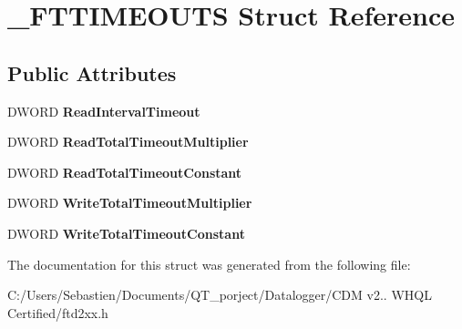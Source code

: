\hypertarget{struct___f_t_t_i_m_e_o_u_t_s}{}\section{\+\_\+\+F\+T\+T\+I\+M\+E\+O\+U\+TS Struct Reference}
\label{struct___f_t_t_i_m_e_o_u_t_s}
\subsection*{Public Attributes}
\begin{DoxyCompactItemize}
\item 
\mbox{\label{struct___f_t_t_i_m_e_o_u_t_s_a0f9592f9863a3230933833750b67d467}} 
D\+W\+O\+RD {\bfseries Read\+Interval\+Timeout}
\item 
\mbox{\label{struct___f_t_t_i_m_e_o_u_t_s_abec01499b73ce0bd194ca0628dbf58e8}} 
D\+W\+O\+RD {\bfseries Read\+Total\+Timeout\+Multiplier}
\item 
\mbox{\label{struct___f_t_t_i_m_e_o_u_t_s_aa6478849c632565b01f91faca975cabe}} 
D\+W\+O\+RD {\bfseries Read\+Total\+Timeout\+Constant}
\item 
\mbox{\label{struct___f_t_t_i_m_e_o_u_t_s_a1944986d4b6760a45db8ce1b58fa3688}} 
D\+W\+O\+RD {\bfseries Write\+Total\+Timeout\+Multiplier}
\item 
\mbox{\label{struct___f_t_t_i_m_e_o_u_t_s_ac36dfafaf9522e0b041080242538d196}} 
D\+W\+O\+RD {\bfseries Write\+Total\+Timeout\+Constant}
\end{DoxyCompactItemize}


The documentation for this struct was generated from the following file\+:\begin{DoxyCompactItemize}
\item 
C\+:/\+Users/\+Sebastien/\+Documents/\+Q\+T\+\_\+porject/\+Datalogger/\+C\+D\+M v2.. W\+H\+Q\+L Certified/ftd2xx.\+h\end{DoxyCompactItemize}
